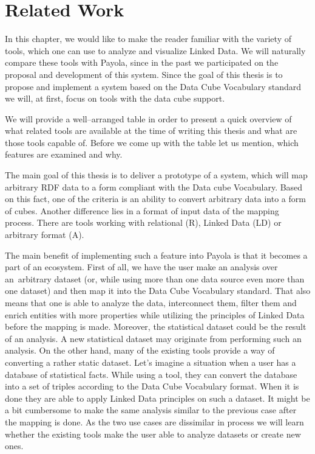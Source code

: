 \chapter{Related Work}
\label{chap:rw}

In this chapter, we would like to make the reader familiar with the variety of tools, which one can
use to analyze and visualize Linked Data. We will naturally compare these tools with
Payola, since in the past we participated on the proposal and development of this system.
Since the goal of this thesis is to propose and implement a system based on the Data Cube Vocabulary
standard we will, at first, focus on tools with the data cube support. 

We will provide a well--arranged table in order to present a quick overview of
what related tools are available at the time of writing this thesis and what are those 
tools capable of. Before we come up with the table let us mention, which
features are examined and why.

The main goal of this thesis is to deliver a prototype of a system, which will map 
arbitrary RDF data to a form compliant with the Data cube Vocabulary. Based on 
this fact, one of the criteria is an ability to convert arbitrary data 
into a form of cubes. Another difference lies in a format of input data of the
mapping process. There are tools working with relational (R), Linked Data (LD) or
arbitrary format (A).

The main benefit of implementing such a feature into Payola is that it becomes a 
part of an ecosystem. First of all, we have the user make an analysis over an~arbitrary
dataset (or, while using more than one data source even more than one dataset)
and then map it into the Data Cube Vocabulary standard. That also means that one is able
to analyze the data, interconnect them, filter them and enrich entities with more properties
while utilizing the principles of Linked Data before the mapping is made. Moreover, the statistical
dataset could be the result of an analysis. A new statistical dataset may originate from performing
such an analysis. On the other hand, many of the existing 
tools provide a way of converting a rather static dataset. Let's imagine a situation when a 
user has a database of statistical facts. While using a tool, they can 
convert the database into a set of triples according to the Data Cube 
Vocabulary format. When it is done they are able to apply Linked Data principles
on such a dataset. It might be a bit cumbersome to make the same analysis similar to
the previous case after the mapping is done. As the two use cases are dissimilar in process 
we will learn whether the existing tools make the user able to analyze datasets or create new ones.

